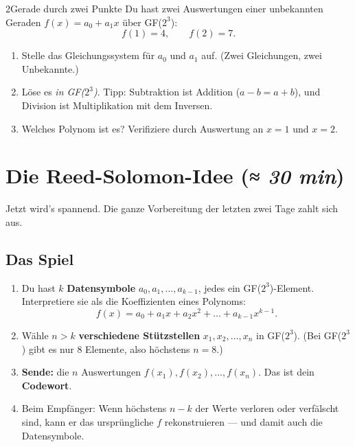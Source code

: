 \begin{bleistiftuebung}{2}{Gerade durch zwei Punkte}
Du hast zwei Auswertungen einer unbekannten Geraden $f(x) = a_0 + a_1 x$
über GF($2^3$):
\[
  f(1) = 4, \qquad f(2) = 7.
\]

\begin{enumerate}[label=(\alph*), leftmargin=*]
\item Stelle das Gleichungssystem für $a_0$ und $a_1$ auf. (Zwei
  Gleichungen, zwei Unbekannte.)
\item Löse es \emph{in GF($2^3$)}. Tipp: Subtraktion ist Addition
  ($a - b = a + b$), und Division ist Multiplikation mit dem
  Inversen.
\item Welches Polynom ist es? Verifiziere durch Auswertung an $x = 1$
  und $x = 2$.
\end{enumerate}
\end{bleistiftuebung}

\section{Die Reed-Solomon-Idee \normalfont(\textit{≈ 30 min})}

Jetzt wird's spannend. Die ganze Vorbereitung der letzten zwei Tage
zahlt sich aus.

\subsection*{Das Spiel}

\begin{enumerate}
\item Du hast $k$ \textbf{Datensymbole} $a_0, a_1, \dots, a_{k-1}$,
  jedes ein GF($2^3$)-Element. Interpretiere sie als die Koeffizienten
  eines Polynoms:
  \[
    f(x) = a_0 + a_1 x + a_2 x^2 + \dots + a_{k-1} x^{k-1}.
  \]
\item Wähle $n > k$ \textbf{verschiedene Stützstellen}
  $x_1, x_2, \dots, x_n$ in GF($2^3$). (Bei GF($2^3$) gibt es nur 8
  Elemente, also höchstens $n = 8$.)
\item \textbf{Sende:} die $n$ Auswertungen $f(x_1), f(x_2), \dots,
  f(x_n)$. Das ist dein \textbf{Codewort}.
\item Beim Empfänger: Wenn höchstens $n - k$ der Werte verloren oder
  verfälscht sind, kann er das ursprüngliche $f$ rekonstruieren — und
  damit auch die Datensymbole.
\end{enumerate}

